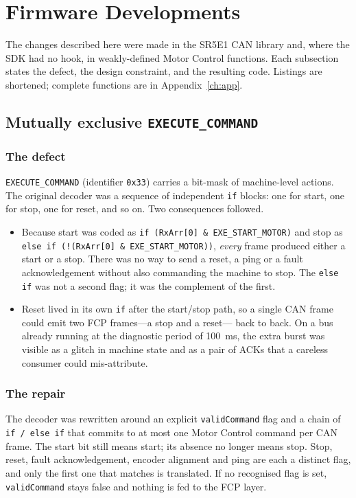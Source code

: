 \chapter{Firmware Developments}
\label{ch:dev}

The changes described here were made in the SR5E1 CAN library and, where
the SDK had no hook, in weakly-defined Motor Control functions. Each
subsection states the defect, the design constraint, and the resulting
code. Listings are shortened; complete functions are in
Appendix~\ref{ch:app}.

\section{Mutually exclusive \texttt{EXECUTE\_COMMAND}}
\label{sec:exec}

\subsection{The defect}
\texttt{EXECUTE\_COMMAND} (identifier \texttt{0x33}) carries a bit-mask of
machine-level actions. The original decoder was a sequence of independent
\texttt{if} blocks: one for start, one for stop, one for reset, and so on.
Two consequences followed.

\begin{itemize}[leftmargin=1.6em]
  \item Because start was coded as
        \texttt{if (RxArr[0] \& EXE\_START\_MOTOR)} and stop as
        \texttt{else if (!(RxArr[0] \& EXE\_START\_MOTOR))}, \emph{every}
        frame produced either a start or a stop. There was no way to send
        a reset, a ping or a fault acknowledgement without also commanding
        the machine to stop. The \texttt{else if} was not a second flag; it
        was the complement of the first.
  \item Reset lived in its own \texttt{if} after the start/stop path, so a
        single CAN frame could emit two FCP frames---a stop and a reset---
        back to back. On a bus already running at the diagnostic period of
        \SI{100}{\milli\second}, the extra burst was visible as a glitch in
        machine state and as a pair of ACKs that a careless consumer could
        mis-attribute.
\end{itemize}

\subsection{The repair}
The decoder was rewritten around an explicit \texttt{validCommand} flag
and a chain of \texttt{if / else if} that commits to at most one Motor
Control command per CAN frame. The start bit still means start; its
absence no longer means stop. Stop, reset, fault acknowledgement, encoder
alignment and ping are each a distinct flag, and only the first one that
matches is translated. If no recognised flag is set,
\texttt{validCommand} stays false and nothing is fed to the FCP layer.

